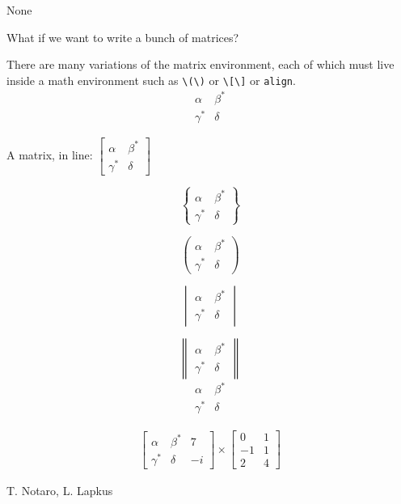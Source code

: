 \documentclass[12pt]{article}
\newenvironment{problem}[2][Problem]
{
	\begin{trivlist} 
		\item[\hskip \labelsep {\bfseries #1 #2:}]
	}
{
	\end{trivlist}
	}
\newenvironment{solution}[1][Solution]
{
	\begin{trivlist} 
		\item[\hskip \labelsep {\itshape #1:}]
	}
	{
	\end{trivlist}
}
\newenvironment{collaborators}[1][Collaborator(s)]
{
	\begin{trivlist} 
		\item[\hskip \labelsep {\bfseries #1:}]
	}
	{
	\end{trivlist}
}
\begin{document}
\begin{collaborators}
	None
\end{collaborators}
\newpage
\begin{problem}{13}
	What if we want to write a bunch of matrices?
\end{problem}
\begin{solution}
	There are many variations of the matrix environment, each of which must live inside a math environment such as \verb|\(\)| or \verb|\[\]| or \verb|align|.
	\[
	\begin{matrix}
		\alpha& \beta^{*}\\
		\gamma^{*}& \delta
	\end{matrix}
	\]

	A matrix, in line: \(
	\begin{bmatrix}
		\alpha&     \beta^{*}\\
		\gamma^{*}& \delta
	\end{bmatrix}
	\)

	\[	
	\begin{Bmatrix}
		\alpha&     \beta^{*}\\
		\gamma^{*}& \delta
	\end{Bmatrix}
	\]
	
	\[
	\begin{pmatrix}
		\alpha&     \beta^{*}\\
		\gamma^{*}& \delta
	\end{pmatrix}
	\]
	
	\[
	\begin{vmatrix}
		\alpha&     \beta^{*}\\
		\gamma^{*}& \delta
	\end{vmatrix}
	\]
	
	\[
	\begin{Vmatrix}
		\alpha&     \beta^{*}\\
		\gamma^{*}& \delta
	\end{Vmatrix}
	\]
	\[
	\begin{smallmatrix}
		\alpha&     \beta^{*}\\
		\gamma^{*}& \delta
	\end{smallmatrix}
	\]
	
	\begin{align}
		\begin{bmatrix}
			\alpha&     \beta^{*} & 7\\
			\gamma^{*}& \delta & -i
		\end{bmatrix}
		\times
		\begin{bmatrix}
		0&1\\
		-1& 1\\
		2 & 4
		\end{bmatrix}
	\end{align}
\end{solution}
\begin{collaborators}
	T. Notaro, L. Lapkus
\end{collaborators}
\end{document}
